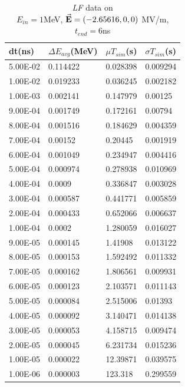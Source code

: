 \documentclass[a4paper,oneside,12pt]{report}
\numberwithin{equation}{chapter}
\begin{document}
\begin{table}[H]
    \centering
    \begin{tabular}{|l|l|l|l|}
    \hline
    dt(ns)       & $\Delta E_{avg}$(MeV) & $\mu T_{sim}$(s)    & $\sigma T_{sim}$(s) \\\hline
    5.00E-02 & 0.114422     & 0.028398 & 0.009294 \\\hline
    1.00E-02 & 0.019233     & 0.036245 & 0.002182 \\\hline
    1.00E-03 & 0.002141     & 0.147979 & 0.00125  \\\hline
    9.00E-04 & 0.001749     & 0.172161 & 0.00794  \\\hline
    8.00E-04 & 0.001516     & 0.184629 & 0.004359 \\\hline
    7.00E-04 & 0.00152      & 0.20445  & 0.001919 \\\hline
    6.00E-04 & 0.001049     & 0.234947 & 0.004416 \\\hline
    5.00E-04 & 0.000974     & 0.278938 & 0.010969 \\\hline
    4.00E-04 & 0.0009       & 0.336847 & 0.003028 \\\hline
    3.00E-04 & 0.000587     & 0.441771 & 0.005859 \\\hline
    2.00E-04 & 0.000433     & 0.652066 & 0.006637 \\\hline
    1.00E-04 & 0.0002       & 1.280059 & 0.016027 \\\hline
    9.00E-05 & 0.000145     & 1.41908  & 0.013122 \\\hline
    8.00E-05 & 0.000153     & 1.592492 & 0.011332 \\\hline
    7.00E-05 & 0.000162     & 1.806561 & 0.009931 \\\hline
    6.00E-05 & 0.000123     & 2.103571 & 0.011143 \\\hline
    5.00E-05 & 0.000084     & 2.515006 & 0.01393  \\\hline
    4.00E-05 & 0.000092     & 3.140471 & 0.014138 \\\hline
    3.00E-05 & 0.000053     & 4.158715 & 0.009474 \\\hline
    2.00E-05 & 0.000045     & 6.231734 & 0.015236 \\\hline
    1.00E-05 & 0.000022     & 12.39871 & 0.039575 \\\hline
    1.00E-06 & 0.000003     & 123.318  & 0.299559 \\\hline
    \end{tabular}
    \caption{\textit{LF} data on \\$E_{in}=1$MeV, $\vec{\textbf{E}}=(-2.65616, 0, 0)$ MV/m, $t_{end}=6$ns}
    \label{tab:lf_statE_table}
\end{table}
\end{document}
